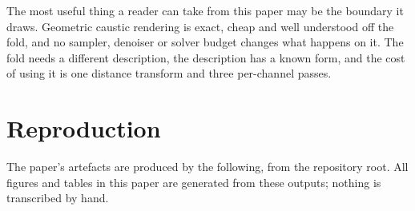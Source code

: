 The most useful thing a reader can take from this paper may be the boundary it draws. Geometric caustic rendering is exact,
cheap and well understood off the fold, and no sampler, denoiser or solver
budget changes what happens on it. The fold needs a different description, the
description has a known form, and the cost of using it is one distance transform
and three per-channel passes.

\section{Reproduction}
\label{sec:repro}

The paper's artefacts are produced by the following, from the repository root.
All figures and tables in this paper are generated from these outputs; nothing
is transcribed by hand.

